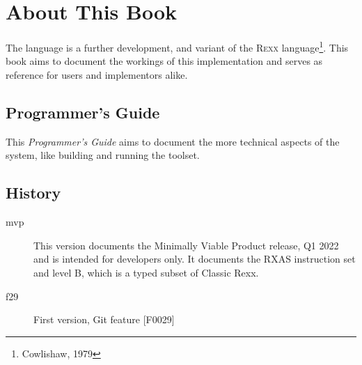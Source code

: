 \def\tightlist{}


\chapter*{About This Book}
The \crexx{} language is a further development, and variant of the
\textsc{Rexx} language\footnote{Cowlishaw, 1979}. This book aims to
document the workings of this implementation and serves as reference
for users and implementors alike.

\section{Programmer's Guide}
This \emph{Programmer's Guide} aims to document the more technical aspects of the \crexx{} system, like building and running the toolset.

\section*{History}

\begin{description}
\item[mvp] This version documents the Minimally Viable Product
  release, Q1 2022 and is intended for developers only. It documents
  the RXAS instruction set and \crexx{} level B, which is a typed
  subset of Classic Rexx.
\item[f29] First version, Git feature [F0029]
\end{description}

